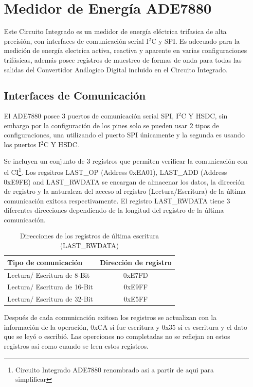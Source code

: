 \documentclass[letterpaper,12pt,oneside]{book}
\begin{document}
		\section{Medidor de Energía ADE7880}
		Este Circuito Integrado es un medidor de energía eléctrica trifasica de alta precisión, con interfaces de comunicación serial I$^2$C y SPI. Es adecuado para la medición de energía electrica activa, reactiva y aparente en varias configuraciones trifásicas, además posee registros de muestreo de formas de onda para todas las salidas del Convertidor Análogico Digital incluido en el Circuito Integrado.

			\subsection{Interfaces de Comunicación}
			El ADE7880 posee 3 puertos de comunicación serial SPI, I$^2$C Y HSDC, sin embargo por la configuración de los pines solo se pueden usar 2 tipos de configuraciones, una utilizando el puerto SPI únicamente y la segunda es usando los puertos I$^2$C Y HSDC.

			Se incluyen un conjunto de 3 registros que permiten verificar la comunicación con el CI\footnote{Circuito Integrado ADE7880 renombrado asi a partir de aqui para simplificar}. Los regsitros LAST\_OP (Address 0xEA01), LAST\_ADD (Address 0xE9FE) and LAST\_RWDATA se encargan de almacenar los datos, la dirección de registro y la naturaleza del acceso al registro (Lectura/Escritura) de la última comunicación exitosa respectivamente. El registro LAST\_RWDATA tiene 3 diferentes direcciones dependiendo de la longitud del registro de la última comunicación.

			\begin{table}[ht]
				\centering
				\begin{tabular}{ l | c }
					\textbf{Tipo de comunicación} & \textbf{Dirección de registro} \\
					\hline
					Lectura/ Escritura de 8-Bit & 0xE7FD \\
					Lectura/ Escritura de 16-Bit & 0xE9FF \\
					Lectura/ Escritura de 32-Bit & 0xE5FF \\
				\end{tabular}
				\caption{Direcciones de los registros de última escritura (LAST\_RWDATA)}
			\end{table}

			Después de cada comunicación exitosa los registros se actualizan con la información de la operación, 0xCA si fue escritura y 0x35 si es escritura y el dato que se leyó o escribió. Las operciones no completadas no se reflejan en estos registros asi como cuando se leen estos registros.
\end{document}
